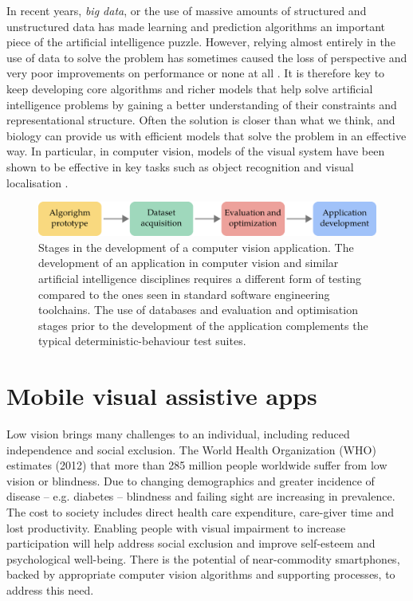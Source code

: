 In recent years, \textit{big data}, or the use of massive amounts of structured and unstructured data has made learning and prediction algorithms an important piece of the artificial intelligence puzzle. However, relying almost entirely in the use of data to solve the problem has sometimes caused the loss of perspective and very poor improvements on performance or none at all \cite{zhu2012we}. It is therefore key to keep developing core algorithms and richer models that help solve artificial intelligence problems by gaining a better understanding of their constraints and representational structure. Often the solution is closer than what we think, and biology can provide us with efficient models that solve the problem in an effective way. In particular, in computer vision, models of the visual system have been shown to be effective in key tasks such as object recognition and visual localisation \cite{lowe2004distinctive,milford2004ratslam}. 


\begin{figure}
\centering
\includegraphics[width=\linewidth]{gfx/Chapter01/cv_dev_pipeline.pdf}
\caption{Stages in the development of a computer vision application. The development of an application in computer vision and similar artificial intelligence disciplines requires a different form of testing compared to the ones seen in standard software engineering toolchains. The use of databases and evaluation and optimisation stages prior to the development of the application complements the typical deterministic-behaviour test suites.}
\label{fig:cv_dev_pipeline}
\end{figure}

\section{Mobile visual assistive apps}

Low vision brings many challenges to an individual, including reduced independence and social exclusion. The World Health Organization (WHO) estimates (2012) that more than 285 million people worldwide suffer from low vision or blindness. Due to changing demographics and greater incidence of disease -- e.g. diabetes -- blindness and failing sight are increasing in prevalence.  The cost to society includes direct health care expenditure, care-giver time and lost productivity.  Enabling people with visual impairment to increase participation will help address social exclusion and improve self-esteem and psychological well-being. There is the potential of near-commodity smartphones, backed by appropriate computer vision algorithms and supporting processes, to address this need.

